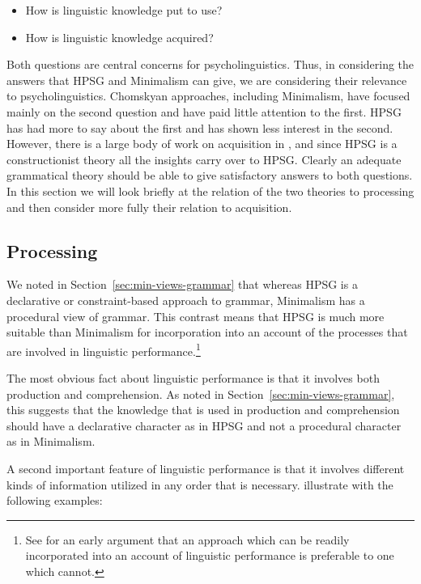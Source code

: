 \documentclass[output=paper
 	        ,biblatex
                ,babelshorthands
                ,newtxmath
                ,draftmode
                ,colorlinks, citecolor=brown
]{langscibook}
\begin{document}
\begin{itemize}
\item How is linguistic knowledge put to use? 
\item How is linguistic knowledge acquired?
\end{itemize}

\noindent
Both questions are central concerns for psycholinguistics. Thus, in considering the answers that
HPSG and Minimalism can give, we are considering their relevance to psycholinguistics. Chomskyan
approaches, including Minimalism, have focused mainly on the second question and have paid little
attention to the first. HPSG has had more to say about the first and has shown less interest in the
second. However, there is a large body of work on acquisition in , and
since HPSG is a constructionist theory  all the insights carry over to HPSG. 
Clearly an adequate grammatical theory should be able to give satisfactory answers to both
questions. In this section we will look briefly at the relation of the two theories to processing
and then consider more fully their relation to acquisition.


\subsection{Processing}
\label{sec-minimalism-processing}

We noted in Section~\ref{sec:min-views-grammar} that whereas HPSG is a declarative or
constraint-based approach to grammar, Minimalism has a procedural view of grammar. This contrast
means that HPSG is much more suitable than Minimalism for incorporation into an account of the
processes that are involved in linguistic performance.\footnote{
  See \citet{BK82a} for an early argument that an approach which can be readily incorporated into an account of linguistic performance is preferable to one which cannot.
}

The most obvious fact about linguistic performance is that it involves both production and
comprehension. As noted in Section~\ref{sec:min-views-grammar}, this suggests that the knowledge
that is used in production and comprehension should have a declarative character as in HPSG and not
a procedural character as in Minimalism.

A second important feature of linguistic performance is
that it involves different kinds of information utilized in any order that is
necessary. \citet[--368]{SW2011a} illustrate with the following examples:
\end{document}
